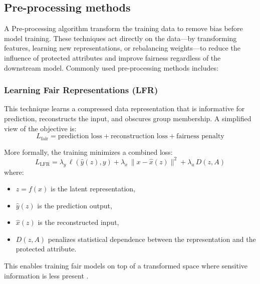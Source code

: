 \documentclass[12pt,a4paper,openright,twoside]{book}
\begin{document}
\subsection{Pre-processing methods} 
A Pre-processing algorithm transform the training data to remove bias before model training. These techniques act directly on the data—by transforming features, learning new representations, or rebalancing weights—to reduce the influence of protected attributes and improve fairness regardless of the downstream model. Commonly used pre-processing methods includes:

\subsubsection{Learning Fair Representations (LFR)} This technique learns a compressed data representation that is informative for prediction, reconstructs the input, and obscures group membership.
A simplified view of the objective is:
\begin{equation}
    {L}_{\text{fair}} = \text{prediction loss} + \text{reconstruction loss} + \text{fairness penalty}
\end{equation}

More formally, the training minimizes a combined loss:
\begin{equation}
    {L}_{\text{LFR}} = \lambda_y\, \ell(\hat{y}(z), y) + \lambda_x\, \lVert x - \hat{x}(z) \rVert^2 + \lambda_a\, D(z, A)
\end{equation}
where:
\begin{itemize}
    \item \begin{math}z = f(x)\end{math} is the latent representation,
    \item \begin{math}\hat{y}(z)\end{math} is the prediction output,
    \item \begin{math}\hat{x}(z)\end{math} is the reconstructed input,
    \item \begin{math}D(z, A)\end{math} penalizes statistical dependence between the representation and the protected attribute.
\end{itemize}
This enables training fair models on top of a transformed space where sensitive information is less present \cite{pmlr-v28-zemel13}.
\end{document}
